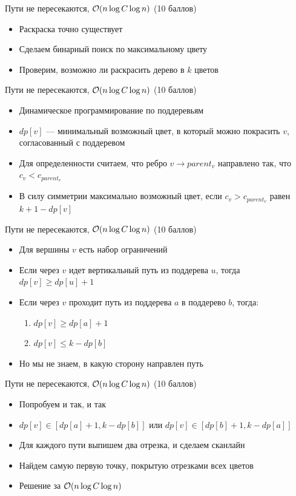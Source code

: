 \begin{frame}{Пути не пересекаются, $\mathcal{O}(n \log C \log n)$ (10 баллов)}
  \begin{itemize}
    \item Раскраска точно существует
    \item Сделаем бинарный поиск по максимальному цвету
    \item Проверим, возможно ли раскрасить дерево в $k$ цветов
  \end{itemize}
\end{frame}

\begin{frame}{Пути не пересекаются, $\mathcal{O}(n \log C \log n)$ (10 баллов)}
  \begin{itemize}
    \item Динамическое программирование по поддеревьям
    \item $dp[v]$ --- минимальный возможный цвет, в который можно покрасить $v$, согласованный с поддеревом
    \item Для определенности считаем, что ребро $v \rightarrow parent_v$ направлено так, что $c_v < c_{parent_v}$
    \item В силу симметрии максимально возможный цвет, если $c_v > c_{parent_v}$ равен $k + 1 - dp[v]$
  \end{itemize}
\end{frame}

\begin{frame}{Пути не пересекаются, $\mathcal{O}(n \log C \log n)$ (10 баллов)}
  \begin{itemize}
    \item Для вершины $v$ есть набор ограничений
    \item Если через $v$ идет вертикальный путь из поддерева $u$, тогда $dp[v] \ge dp[u] + 1$
    \item Если через $v$ проходит путь из поддерева $a$ в поддерево $b$, тогда:
    \begin{enumerate}
        \item $dp[v] \ge dp[a] + 1$
        \item $dp[v] \le k - dp[b]$
    \end{enumerate}
    \item Но мы не знаем, в какую сторону направлен путь
  \end{itemize}
\end{frame}

\begin{frame}{Пути не пересекаются, $\mathcal{O}(n \log C \log n)$ (10 баллов)}
  \begin{itemize}
    \item Попробуем и так, и так
    \item $dp[v] \in [dp[a] + 1, k - dp[b]]$ или $dp[v] \in [dp[b] + 1, k - dp[a]]$
    \item Для каждого пути выпишем два отрезка, и сделаем сканлайн
    \item Найдем самую первую точку, покрытую отрезками всех цветов
    \item Решение за $\mathcal{O}(n \log C \log n)$
  \end{itemize}
\end{frame}

